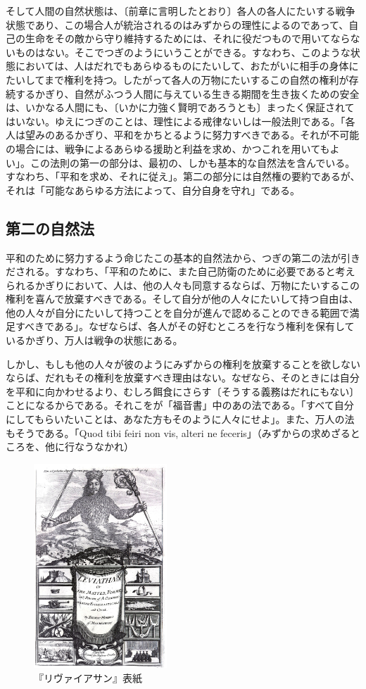 そして人間の自然状態は、〔前章に言明したとおり〕各人の各人にたいする戦争状態であり、この場合人が統治されるのはみずからの理性によるのであって、自己の生命をその敵から守り維持するためには、それに役だつもので用いてならないものはない。そこでつぎのようにいうことができる。すなわち、このような状態においては、人はだれでもあらゆるものにたいして、おたがいに相手の身体にたいしてまで権利を持つ。したがって各人の万物にたいするこの自然の権利が存続するかぎり、自然がふつう人間に与えている生きる期間を生き抜くための安全は、いかなる人間にも、〔いかに力強く賢明であろうとも〕まったく保証されてはいない。ゆえにつぎのことは、理性による戒律ないしは一般法則である。「各人は望みのあるかぎり、平和をかちとるように努力すべきである。それが不可能の場合には、戦争によるあらゆる援助と利益を求め、かつこれを用いてもよい」。この法則の第一の部分は、最初の、しかも基本的な自然法を含んでいる。すなわち、「平和を求め、それに従え」。第二の部分には自然権の要約であるが、それは「可能なあらゆる方法によって、自分自身を守れ」である。

\subsection{第二の自然法}



平和のために努力するよう命じたこの基本的自然法から、つぎの第二の法が引きだされる。すなわち、「平和のために、また自己防衛のために必要であると考えられるかぎりにおいて、人は、他の人々も同意するならば、万物にたいするこの権利を喜んで放棄すべきである。そして自分が他の人々にたいして持つ自由は、他の人々が自分にたいして持つことを自分が進んで認めることのできる範囲で満足すべきである」。なぜならば、各人がその好むところを行なう権利を保有しているかぎり、万人は戦争の状態にある。

しかし、もしも他の人々が彼のようにみずからの権利を放棄することを欲しないならば、だれもその権利を放棄すべき理由はない。なぜなら、そのときには自分を平和に向かわせるより、むしろ餌食にさらす〔そうする義務はだれにもない〕ことになるからである。それこをが「福音書」中のあの法である。「すべて自分にしてもらいたいことは、あなた方もそのように人々にせよ」。また、万人の法もそうである。「Quod tibi feiri non vis, alteri ne feceris」（みずからの求めざるところを、他に行なうなかれ）


  \begin{figure}[htbp]
    \centering
      \includegraphics[width=50mm]{images/leviathan.jpg}
    \caption{『リヴァイアサン』表紙}
  \end{figure}



